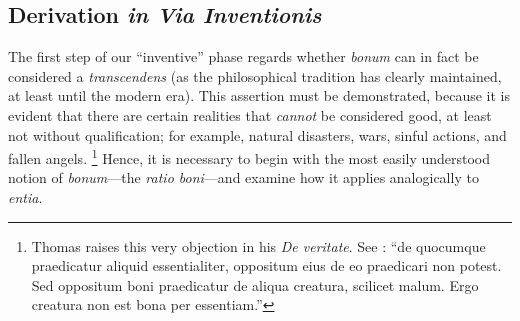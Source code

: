 {\subsection{Derivation \emph{in Via Inventionis}}

The first step of our ``inventive'' phase regards whether \emph{bonum} can in fact be considered a \emph{transcendens} (as the philosophical tradition has clearly maintained, at least until the modern era). This assertion must be demonstrated, because it is evident that there are certain realities that \emph{cannot} be considered good, at least not without qualification; for example, natural disasters, wars, sinful actions, and fallen angels.%
%
\footnote{Thomas raises this very objection in his \emph{De veritate}. See \cite[q.~21, a.~5, arg.~3.]{st:deveritate}: ``de quocumque praedicatur aliquid essentialiter, oppositum eius de eo praedicari non potest. Sed oppositum boni praedicatur de aliqua creatura, scilicet malum. Ergo creatura non est bona per essentiam.''} Hence, it is necessary to begin with the most easily understood notion of \emph{bonum}---the \emph{ratio boni}---and examine how it applies analogically to \emph{entia}.

}
